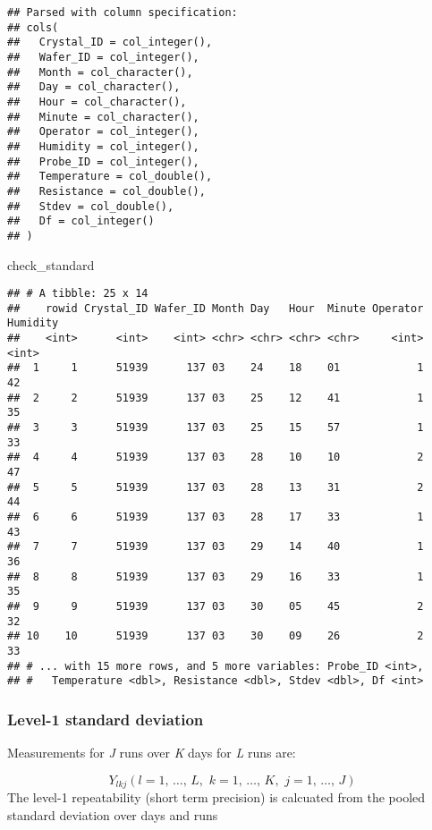 \documentclass[]{book}
\newenvironment{Shaded}{\begin{snugshade}}{\end{snugshade}}
\newcommand{\NormalTok}[1]{#1}
\theoremstyle{definition}
\theoremstyle{definition}
\theoremstyle{definition}
\theoremstyle{remark}
\begin{document}
\begin{verbatim}
## Parsed with column specification:
## cols(
##   Crystal_ID = col_integer(),
##   Wafer_ID = col_integer(),
##   Month = col_character(),
##   Day = col_character(),
##   Hour = col_character(),
##   Minute = col_character(),
##   Operator = col_integer(),
##   Humidity = col_integer(),
##   Probe_ID = col_integer(),
##   Temperature = col_double(),
##   Resistance = col_double(),
##   Stdev = col_double(),
##   Df = col_integer()
## )
\end{verbatim}

\begin{Shaded}
\begin{Highlighting}[]
\NormalTok{check_standard}
\end{Highlighting}
\end{Shaded}

\begin{verbatim}
## # A tibble: 25 x 14
##    rowid Crystal_ID Wafer_ID Month Day   Hour  Minute Operator Humidity
##    <int>      <int>    <int> <chr> <chr> <chr> <chr>     <int>    <int>
##  1     1      51939      137 03    24    18    01            1       42
##  2     2      51939      137 03    25    12    41            1       35
##  3     3      51939      137 03    25    15    57            1       33
##  4     4      51939      137 03    28    10    10            2       47
##  5     5      51939      137 03    28    13    31            2       44
##  6     6      51939      137 03    28    17    33            1       43
##  7     7      51939      137 03    29    14    40            1       36
##  8     8      51939      137 03    29    16    33            1       35
##  9     9      51939      137 03    30    05    45            2       32
## 10    10      51939      137 03    30    09    26            2       33
## # ... with 15 more rows, and 5 more variables: Probe_ID <int>,
## #   Temperature <dbl>, Resistance <dbl>, Stdev <dbl>, Df <int>
\end{verbatim}

\hypertarget{level-1-standard-deviation}{%
\subsubsection{Level-1 standard
deviation}\label{level-1-standard-deviation}}

Measurements for \emph{J} runs over \emph{K} days for \emph{L} runs are:

\[
Y_{lkj}(l = 1, \, \ldots, \, L, \,\, k=1, \,\ldots, \, K, \,\, j=1, \,\ldots, \, J)
\] The level-1 repeatability (short term precision) is calcuated from
the pooled standard deviation over days and runs
\end{document}
